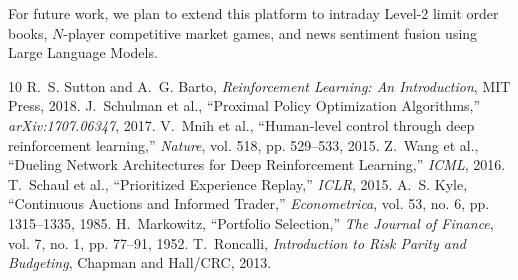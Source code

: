 \documentclass[10pt,journal,compsoc]{IEEEtran}
\begin{document}
For future work, we plan to extend this platform to intraday Level-2 limit order books, $N$-player competitive market games, and news sentiment fusion using Large Language Models.

\begin{thebibliography}{10}
 R.~S. Sutton and A.~G. Barto, \textit{Reinforcement Learning: An Introduction}, MIT Press, 2018.
 J.~Schulman et al., ``Proximal Policy Optimization Algorithms,'' \textit{arXiv:1707.06347}, 2017.
 V.~Mnih et al., ``Human-level control through deep reinforcement learning,'' \textit{Nature}, vol. 518, pp. 529--533, 2015.
 Z.~Wang et al., ``Dueling Network Architectures for Deep Reinforcement Learning,'' \textit{ICML}, 2016.
 T.~Schaul et al., ``Prioritized Experience Replay,'' \textit{ICLR}, 2015.
 A.~S. Kyle, ``Continuous Auctions and Informed Trader,'' \textit{Econometrica}, vol. 53, no. 6, pp. 1315--1335, 1985.
 H.~Markowitz, ``Portfolio Selection,'' \textit{The Journal of Finance}, vol. 7, no. 1, pp. 77--91, 1952.
 T.~Roncalli, \textit{Introduction to Risk Parity and Budgeting}, Chapman and Hall/CRC, 2013.
\end{thebibliography}
\end{document}
